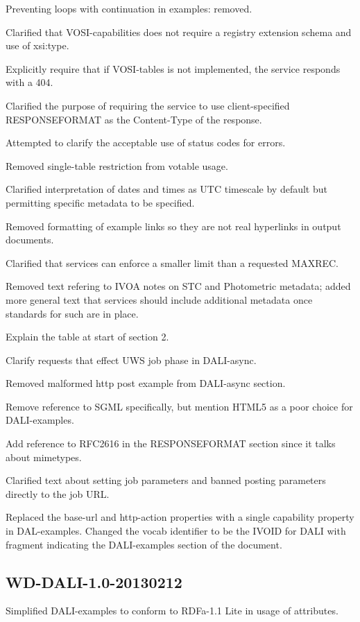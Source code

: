 \documentclass[11pt,letter]{ivoa}
\begin{document}
Preventing loops with continuation in examples: removed.

Clarified that VOSI-capabilities does not require a registry extension schema
and use of xsi:type.

Explicitly require that if VOSI-tables is not implemented, the service responds
with a 404.

Clarified the purpose of requiring the service to use client-specified
RESPONSEFORMAT as the Content-Type of the response.

Attempted to clarify the acceptable use of status codes for errors.

Removed single-table restriction from votable usage.

Clarified interpretation of dates and times as UTC timescale by default but
permitting specific metadata to be specified.

Removed formatting of example links so they are not real hyperlinks in output
documents.

Clarified that services can enforce a smaller limit than a requested MAXREC.

Removed text refering to IVOA notes on STC and Photometric metadata; added more
general text that services should include additional metadata once standards for
such are in place.

Explain the table at start of section 2.

Clarify requests that effect UWS job phase in DALI-async.

Removed malformed http post example from DALI-async section.

Remove reference to SGML specifically, but mention HTML5 as a poor choice for
DALI-examples.

Add reference to RFC2616 in the RESPONSEFORMAT section since it talks about
mimetypes.

Clarified text about setting job parameters and banned posting parameters
directly to the job URL.

Replaced the base-url and http-action properties with a single capability
property in DAL-examples. Changed the vocab identifier to be the IVOID for DALI
with fragment indicating the DALI-examples section of the document.

\subsection{WD-DALI-1.0-20130212}
Simplified DALI-examples to conform to RDFa-1.1 Lite in usage of attributes.


\end{document}

